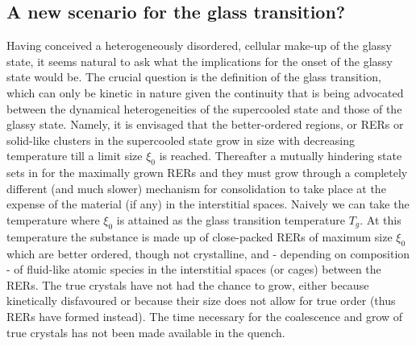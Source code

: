 \documentclass[10pt]{article}
\begin{document}
\subsection{A new scenario for the glass transition?}
Having conceived a heterogeneously disordered, cellular make-up of the glassy 
state, it seems natural to ask what the implications for the onset of the glassy
state would be. The crucial question is the definition of the glass transition, which 
can only be kinetic in nature given the continuity that is being advocated between
the dynamical heterogeneities of the supercooled state and those of the glassy
state. Namely, it is envisaged that the better-ordered regions, or RERs or solid-like
clusters in the supercooled state grow in size with decreasing temperature till a
limit size $\xi_0$ is reached. Thereafter a mutually hindering state sets in for the
maximally grown RERs and they must grow through a completely different (and 
much slower) mechanism for consolidation to take place at the expense of the 
material (if any) in the interstitial spaces. Naively we can take the temperature where
$\xi_0$ is attained as the glass transition temperature $T_g$. At this temperature 
the substance is made up of close-packed RERs of maximum size $\xi_0$ which are 
better ordered, though not crystalline, and - depending on composition - of fluid-like
atomic species in the interstitial spaces (or cages) between the RERs. The true 
crystals have not had the chance to grow, either because kinetically disfavoured or 
because their size does not allow for true order (thus RERs have formed instead). 
The time necessary for the coalescence and grow of true crystals has not been 
made available in the quench.
\end{document}
